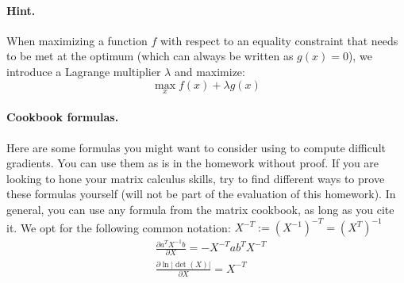\documentclass[submit]{harvardml}
\begin{document}
\begin{problem}
\paragraph{Hint.} When maximizing a function $f$ with respect to an equality
constraint that needs to be met at the optimum (which can always be written as
$g(x) = 0$), we introduce a Lagrange multiplier $\lambda$ and maximize: $$\max_x
f(x) + \lambda g(x)$$

\paragraph{Cookbook formulas.} Here are some formulas you might want to consider
using to compute difficult gradients. You can use them as is in the homework
without proof. If you are looking to hone your matrix calculus skills, try to
find different ways to prove these formulas yourself (will not be part of the
evaluation of this homework). In general, you can use any formula from the matrix cookbook,
as long as you cite it. We opt for the following common notation:
$X^{-T} := (X^{-1})^{-T} = (X^{T})^{-1}$
\begin{align*}
  & \frac{\partial a^T X^{-1} b}{\partial X} = - X^{-T} a b^T X^{-T} \\
  & \frac{\partial \ln | \det (X) |}{\partial X} = X^{-T}
 \end{align*}
 \end{problem}
\end{document}
